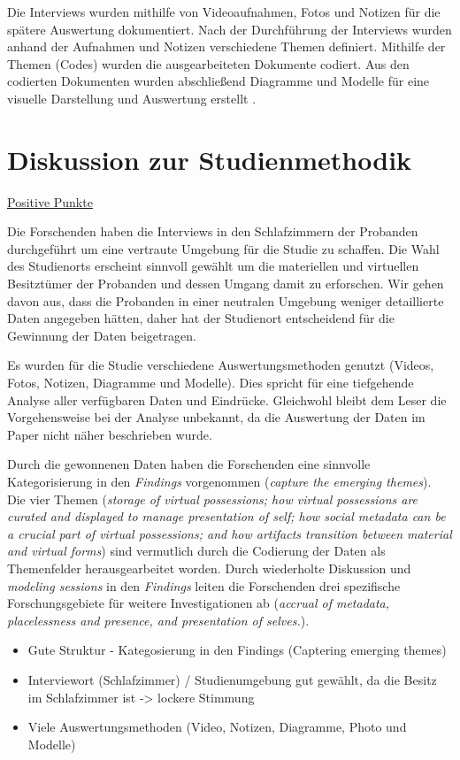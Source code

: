 \documentclass{hsflensburg}
\begin{document}
	Die Interviews wurden mithilfe von Videoaufnahmen, Fotos und Notizen für die spätere Auswertung dokumentiert. Nach der Durchführung
	der Interviews wurden anhand der Aufnahmen und Notizen verschiedene Themen
	definiert. Mithilfe der Themen (Codes) wurden die ausgearbeiteten
	Dokumente codiert. Aus den codierten Dokumenten wurden abschließend Diagramme und Modelle für eine visuelle Darstellung und Auswertung erstellt  \cite{odom2011teenagers}. 

	\section{Diskussion zur Studienmethodik}

	\underline{Positive Punkte}

	Die Forschenden haben die Interviews in den Schlafzimmern der Probanden durchgeführt um eine vertraute Umgebung für die Studie zu schaffen. Die Wahl des Studienorts erscheint sinnvoll gewählt um die materiellen und virtuellen Besitztümer der Probanden und dessen Umgang damit zu erforschen. Wir gehen davon aus, dass die Probanden in einer neutralen Umgebung weniger detaillierte Daten angegeben hätten, daher hat der Studienort entscheidend für die Gewinnung der Daten beigetragen.

	Es wurden für die Studie verschiedene Auswertungsmethoden genutzt (Videos, Fotos, Notizen, Diagramme und Modelle). Dies spricht für eine tiefgehende Analyse aller verfügbaren Daten und Eindrücke. Gleichwohl bleibt dem Leser die Vorgehensweise bei der Analyse unbekannt, da die Auswertung der Daten im Paper nicht näher beschrieben wurde.   

	Durch die gewonnenen Daten haben die Forschenden eine sinnvolle Kategorisierung in den \textit{Findings} vorgenommen (\textit{capture the emerging themes}). Die vier Themen (\textit{storage of virtual possessions; how virtual possessions are curated and displayed to manage presentation of self; how social metadata can be a crucial part of virtual possessions; and how artifacts transition between material and virtual forms}) sind vermutlich durch die Codierung der Daten als Themenfelder herausgearbeitet worden. Durch wiederholte Diskussion und \textit{modeling sessions} in den \textit{Findings} leiten die Forschenden drei spezifische Forschungsgebiete für weitere Investigationen ab (\textit{accrual of metadata, placelessness and presence, and presentation of selves.}).   

	\begin{itemize}
	\item Gute Struktur - Kategosierung in den Findings (Captering emerging themes)
 	\item Interviewort (Schlafzimmer) / Studienumgebung  gut gewählt, da die Besitz im Schlafzimmer ist -> lockere Stimmung
 	\item Viele Auswertungsmethoden (Video, Notizen, Diagramme, Photo und Modelle)
	\end{itemize}
\end{document}
